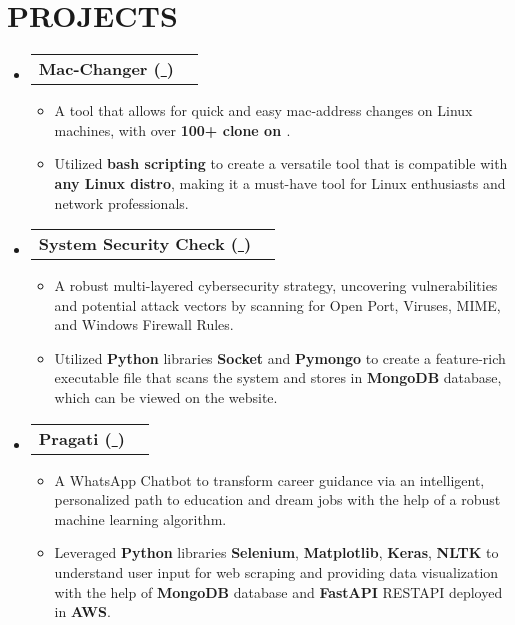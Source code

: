 \documentclass[letterpaper,11pt]{article}
\makeatletter
\newcommand{\myuline}[1]{%
  \uline{\phantom{#1}}%
  \llap{\contour{white}{#1}}%
}
\newcommand{\resumeItem}[1]{
  \item\small{
    {#1 \vspace{-1pt}}
  }
}
\newcommand{\resumeProjectHeading}[2]{
    \item
    \begin{tabular*}{\textwidth}{l@{\extracolsep{\fill}}r}
      #1 & {\color{dark-grey}} \\
    \end{tabular*}\vspace{-4pt}
}
\newcommand{\resumeSubHeadingListStart}{\begin{itemize}[leftmargin=0in, label={}]}
\newcommand{\resumeSubHeadingListEnd}{\end{itemize}}
\newcommand{\resumeItemListStart}{\begin{itemize}}
\newcommand{\resumeItemListEnd}{\end{itemize}\vspace{0pt}}
\makeatother
\begin{document}

\section{PROJECTS}
    \resumeSubHeadingListStart
              
    \resumeProjectHeading
          {\textbf{Mac-Changer
          (\href{https://github.com/samrath-sudesh-acharya/Mac-Changer}{\myuline {GitHub}})}}{Sept. 2020 -- Nov. 2020}
          \resumeItemListStart
            \resumeItem{A tool that allows for quick and easy mac-address changes on Linux machines, with over {\textbf{100+ clone on \myuline{GitHub}}}.}
            \resumeItem{Utilized \textbf{bash scripting} to create a versatile tool that is compatible with \textbf{any Linux distro}, making it a must-have tool for Linux enthusiasts and network professionals.}
          \resumeItemListEnd
          
     \resumeProjectHeading
          {\textbf{System Security Check (\href{https://github.com/samrath-sudesh-acharya/SystemSecuirtyCheck}{\myuline {GitHub}})}}{Sept. 2020 -- Nov. 2020}
          \resumeItemListStart
            \resumeItem{A robust multi-layered cybersecurity strategy, uncovering vulnerabilities and potential attack vectors by scanning for Open Port, Viruses, MIME, and Windows Firewall Rules.}
            \resumeItem{Utilized \textbf{Python} libraries \textbf{Socket} and \textbf{Pymongo} to create a feature-rich executable file that scans the system and stores in  \textbf{MongoDB} database, which can be viewed on the website.}
          \resumeItemListEnd  
          
    \resumeProjectHeading
          {\textbf{Pragati (\href{https://github.com/samrath-sudesh-acharya/Education-Chatbot-}{\myuline {GitHub}})}}{Sept. 2020 -- Nov. 2020}
          \resumeItemListStart
            \resumeItem{A WhatsApp Chatbot to transform career guidance via an intelligent, personalized path to education and dream jobs with the help of a robust machine learning algorithm.}
            \resumeItem{Leveraged \textbf{Python} libraries \textbf{Selenium}, \textbf{Matplotlib}, \textbf{Keras}, \textbf{NLTK} to understand user input for web scraping and providing data visualization with the help of \textbf{MongoDB} database and \textbf{FastAPI} RESTAPI deployed in \textbf{AWS}.}
          \resumeItemListEnd  
          
          
    \resumeSubHeadingListEnd
\end{document}
